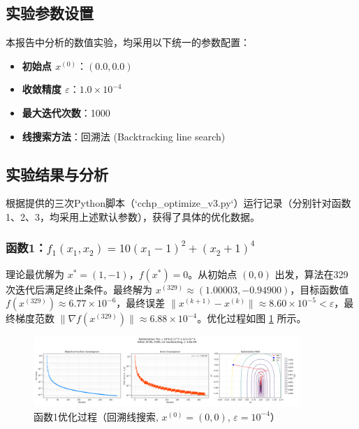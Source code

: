\documentclass[12pt]{article} %
\begin{document}
\subsection{实验参数设置}
本报告中分析的数值实验，均采用以下统一的参数配置：
\begin{itemize}
    \item \textbf{初始点 \(x^{(0)}\)}：\((0.0, 0.0)\)
    \item \textbf{收敛精度 \(\varepsilon\)}：\(1.0 \times 10^{-4}\)
    \item \textbf{最大迭代次数}：1000
    \item \textbf{线搜索方法}：回溯法 (Backtracking line search)
\end{itemize}

\subsection{实验结果与分析}
根据提供的三次Python脚本（`cchp\_optimize\_v3.py`）运行记录（分别针对函数1、2、3，均采用上述默认参数），获得了具体的优化数据。

\subsubsection{函数1：\(f_1(x_1, x_2) = 10(x_1-1)^2 + (x_2+1)^4\)}                                                          
理论最优解为 \(x^*=(1, -1)\)，\(f(x^*)=0\)。从初始点 \((0,0)\) 出发，算法在329次迭代后满足终止条件。最终解为 \(x^{(329)} \approx (1.00003, -0.94900)\)，目标函数值 \(f(x^{(329)}) \approx 6.77 \times 10^{-6}\)，最终误差 \(\|x^{(k+1)} - x^{(k)}\| \approx 8.60 \times 10^{-5} < \varepsilon\)，最终梯度范数 \(\|\nabla f(x^{(329)})\| \approx 6.88 \times 10^{-4}\)。优化过程如图 \ref{fig:f1_results_actual} 所示。

\begin{figure}[H]
  \centering
  \includegraphics[width=0.9\textwidth]{../fig/opt_F1_x0_0p0_0p0_LS_backtracking_20250524-211744.png}

  \caption{函数1优化过程（回溯线搜索, \(x^{(0)}=(0,0)\), \(\varepsilon=10^{-4}\)）}
  \label{fig:f1_results_actual}
\end{figure}
\end{document}
